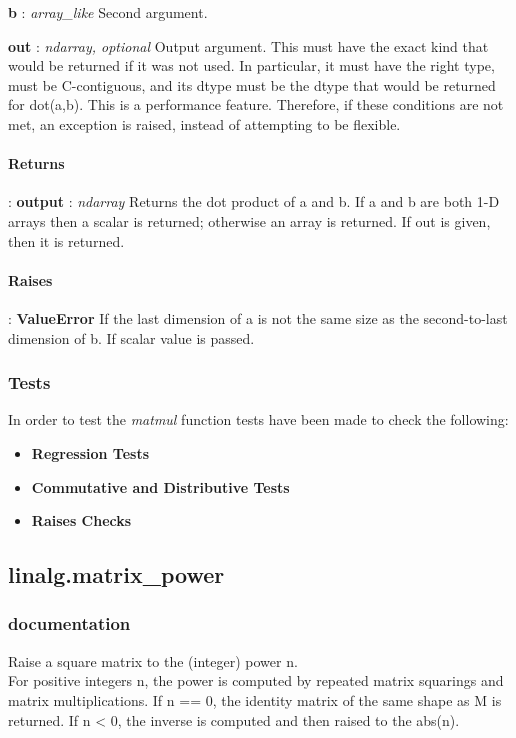 \documentclass[a4paper,11pt]{article}
\begin{document}
\textbf{b} : \textit{array\_like} Second argument.

\textbf{out} : \textit{ndarray, optional} Output argument. This must have the exact kind that would be returned if it was not used. In particular, it must have the right type, must be C-contiguous, and its dtype must be the dtype that would be returned for dot(a,b). This is a performance feature. Therefore, if these conditions are not met, an exception is raised, instead of attempting to be flexible.

\paragraph{Returns}:	
\textbf{output} : \textit{ndarray} Returns the dot product of a and b. If a and b are both 1-D arrays then a scalar is returned; otherwise an array is returned. If out is given, then it is returned.

\paragraph{Raises}:	\textbf{ValueError} If the last dimension of a is not the same size as the second-to-last dimension of b. If scalar value is passed.

\subsubsection{Tests}
In order to test the \textit{matmul} function tests have been made to check the following:

\begin{itemize}
	\item \textbf{Regression Tests}
	\item \textbf{Commutative and Distributive Tests}
	\item \textbf{Raises Checks}
\end{itemize}


\subsection{linalg.matrix\_power}
\subsubsection{documentation}
Raise a square matrix to the (integer) power n.\\ For positive integers n, the power is computed by repeated matrix squarings and matrix multiplications. If n == 0, the identity matrix of the same shape as M is returned. If n < 0, the inverse is computed and then raised to the abs(n).
\end{document}

